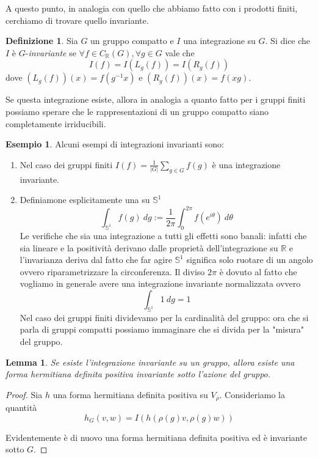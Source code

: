 \documentclass[11pt]{article}
\theoremstyle{plain}
\newtheorem{lemma}[thm]{Lemma}
\theoremstyle{definition}
\newtheorem{defn}{Definizione}[section]
\newtheorem{exmp}{Esempio}[section]
\theoremstyle{remark}
\newcommand{\R}{\mathbb{R}}
\newcommand{\dint}{\displaystyle\int}
\begin{document}
A questo punto, in analogia con quello che abbiamo fatto con i prodotti finiti, cerchiamo di trovare quello invariante.

\begin{defn} Sia $G$ un gruppo compatto e $I$ una integrazione su $G$. Si dice che $I$ è $G$-\textit{invariante} se $\forall f\in C_{\R}(G), \forall g\in G$ vale che
\[ I(f) = I(L_g(f)) = I(R_g(f))\]
dove $(L_g(f))(x) = f(g^{-1}x)$ e $(R_g(f))(x) = f(xg)$.
\end{defn}
Se questa integrazione esiste, allora in analogia a quanto fatto per i gruppi finiti possiamo sperare che le rappresentazioni di un gruppo compatto siano completamente irriducibili.


\begin{exmp}Alcuni esempi di integrazioni invarianti sono:
	\begin{enumerate}
		\item Nel caso dei gruppi finiti $I(f)=\frac{1}{|G|}\sum_{g\in G}f(g)$ è una integrazione invariante.
		\item Definiamone esplicitamente una su $\mathbb{S}^1$
		\[\dint_{\mathbb{S}^1}f(g)\ dg:=\frac{1}{2\pi}\dint_0^{2\pi}f(e^{i\theta})\ d\theta\]
		Le verifiche che sia una integrazione a tutti gli effetti sono banali: infatti che sia lineare e la positività derivano dalle proprietà dell'integrazione su $\R$ e l'invarianza deriva dal fatto che far agire $\mathbb{S}^1$ significa solo ruotare di un angolo ovvero riparametrizzare la circonferenza.
		Il diviso $2\pi$ è dovuto al fatto che vogliamo in generale avere una integrazione invariante normalizzata ovvero
		\[\dint_{\mathbb{S}^1}1\ dg=1\]
		Nel caso dei gruppi finiti dividevamo per la cardinalità del gruppo: ora che si parla di gruppi compatti possiamo immaginare che si divida per la "misura" del gruppo.
	\end{enumerate}
\end{exmp}

\begin{lemma}
  Se esiste l'integrazione invariante su un gruppo, allora esiste una forma hermitiana definita positiva invariante sotto l'azione del gruppo.
\end{lemma}
\begin{proof}
  Sia $h$ una forma hermitiana definita positiva su $V_\rho$. Consideriamo la quantità
  \[ h_G(v,w) = I( h(\rho(g) v, \rho(g) w)) \]

  Evidentemente è di nuovo una forma hermitiana definita positiva ed è invariante sotto $G$.


\end{proof}
\end{document}
